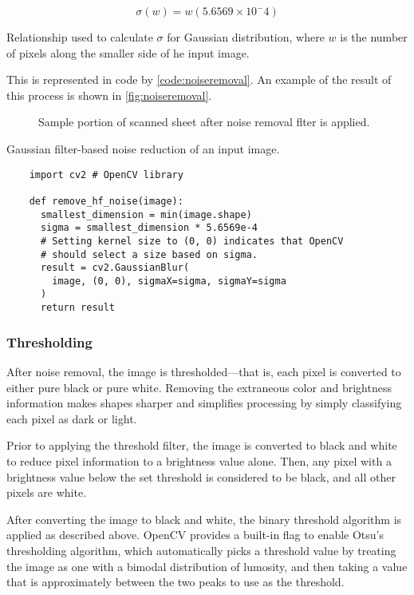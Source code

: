 \documentclass[12pt, letterpaper]{report}
\newcommand*{\itemref}[1]{\hyperref[{#1}]{\autoref*{#1}}}
\newcommand*{\boxedimage}[1]{\fbox{\texttt{[image: img/\#1]}}}
\newcommand{\fig}[3]{
  \begin{figure}[!htbp]
    \caption{#1}
    \label{#3}
    \centering
    \boxedimage{#2}
  \end{figure}
}
\newcommand{\eq}[3]{
  \begin{eqn}[!htbp]
    #2
    \caption{#1}
    \label{#3}
  \end{eqn}
}
\begin{document}
\eq{Relationship used to calculate $\sigma$ for Gaussian distribution, where $w$ is the number of pixels along the smaller side of he input image.}{\[ \sigma(w)=w(5.6569\times10^-4) \]}{eq:sigma}

This is represented in code by \itemref{code:noiseremoval}. An example of
the result of this process is shown in \itemref{fig:noiseremoval}.

\fig{Sample portion of scanned sheet after noise removal flter is applied.}{sample/noise_filtered.jpg}{fig:noiseremoval}

\begin{codesample}[!htbp]
  \caption{Gaussian filter-based noise reduction of an input image.}
  \label{code:noiseremoval}
  \begin{verbatim}
    import cv2 # OpenCV library

    def remove_hf_noise(image):
      smallest_dimension = min(image.shape)
      sigma = smallest_dimension * 5.6569e-4
      # Setting kernel size to (0, 0) indicates that OpenCV
      # should select a size based on sigma.
      result = cv2.GaussianBlur(
        image, (0, 0), sigmaX=sigma, sigmaY=sigma
      )
      return result
  \end{verbatim}
\end{codesample}

\subsubsection{Thresholding}

After noise removal, the image is thresholded---that is, each
pixel is converted to either pure black or pure white.
Removing the extraneous color and brightness information
makes shapes sharper and simplifies processing by simply
classifying each pixel as dark or light.

Prior to applying the threshold filter, the image is converted to black and
white to reduce pixel information to a brightness value alone. Then, any pixel
with a brightness value below the set threshold is considered to be black, and
all other pixels are white.

After converting the image to black and white, the binary threshold algorithm is
applied as described above. OpenCV provides a built-in flag to enable Otsu's
thresholding algorithm, which automatically picks a threshold value by treating the image
as one with a bimodal distribution of lumosity, and then taking a value that is
approximately between the two peaks to use as the threshold.
\end{document}
